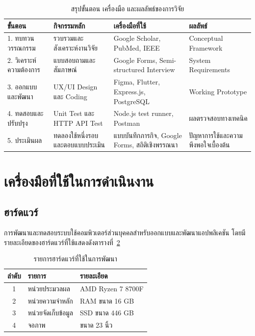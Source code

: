 \begin{table}[H]
\centering
\caption{สรุปขั้นตอน เครื่องมือ และผลลัพธ์ของการวิจัย}
\label{tab:research-summary}
\small
\begin{tabular}{|p{1.8cm}|p{2.7cm}|p{2.5cm}|p{2.7cm}|}
\hline
\textbf{ขั้นตอน} & \textbf{กิจกรรมหลัก} & \textbf{เครื่องมือที่ใช้} & \textbf{ผลลัพธ์} \\ \hline
1. ทบทวนวรรณกรรม & รวบรวมและสังเคราะห์งานวิจัย & Google Scholar, PubMed, IEEE & Conceptual Framework \\ \hline
2. วิเคราะห์ความต้องการ & แบบสอบถามและสัมภาษณ์ & Google Forms, Semi-structured Interview & System Requirements \\ \hline
3. ออกแบบและพัฒนา & UX/UI Design และ Coding & Figma, Flutter, Express.js, PostgreSQL & Working Prototype \\ \hline
4. ทดสอบและปรับปรุง & Unit Test และ HTTP API Test & Node.js test runner, Postman & ผลตรวจสอบทางเทคนิค \\ \hline
5. ประเมินผล & ทดลองใช้หนึ่งรอบและตอบแบบประเมิน & แบบบันทึกภารกิจ, Google Forms, สถิติเชิงพรรณนา & ปัญหาการใช้และความพึงพอใจเบื้องต้น \\ \hline
\end{tabular}
\end{table}

\section{เครื่องมือที่ใช้ในการดำเนินงาน}

\subsection{ฮาร์ดแวร์}

การพัฒนาและทดสอบระบบใช้คอมพิวเตอร์ส่วนบุคคลสำหรับออกแบบและพัฒนาแอปพลิเคชัน โดยมีรายละเอียดของฮาร์ดแวร์ที่ใช้แสดงดังตารางที่~\ref{tab:hardware-tools}

\begin{table}[H]
\centering
\caption{รายการฮาร์ดแวร์ที่ใช้ในการพัฒนา}
\label{tab:hardware-tools}
\small
\begin{tabular}{|c|p{4.1cm}|p{5.1cm}|}
\hline
\textbf{ลำดับ} & \textbf{รายการ} & \textbf{รายละเอียด} \\ \hline
1 & หน่วยประมวลผล & AMD Ryzen 7 8700F \\ \hline
2 & หน่วยความจำหลัก & RAM ขนาด 16 GB \\ \hline
3 & หน่วยจัดเก็บข้อมูล & SSD ขนาด 446 GB \\ \hline
4 & จอภาพ & ขนาด 23 นิ้ว \\ \hline
\end{tabular}
\end{table}

